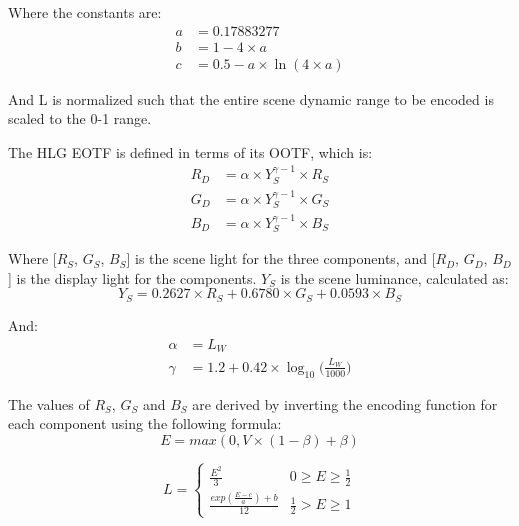 Where the constants are:
\begin{align}
    a &= 0.17883277 \nonumber \\
    b &= 1 - 4 \times a \nonumber \\
    c &= 0.5 - a \times \ln (4 \times a) \nonumber
\end{align}

And L is normalized such that the entire scene dynamic range to be encoded is scaled to the 0-1 range.

\begin{figure}[H]
    \label{fig:hlg-oetf}
\end{figure}

The HLG EOTF is defined in terms of its OOTF, which is:
\begin{align}
    R_D &= \alpha \times Y_S^{\gamma -1}  \times R_S \nonumber \\
    G_D &= \alpha \times Y_S^{\gamma -1}  \times G_S \\
    B_D &= \alpha \times Y_S^{\gamma -1}  \times B_S \nonumber
\end{align}

Where [\(R_S\), \(G_S\), \(B_S\)] is the scene light for the three components, and  [\(R_D\), \(G_D\), \(B_D\)] is the display light for the components.
\(Y_S\) is the scene luminance, calculated as:
\begin{equation}
    Y_S = 0.2627 \times R_S + 0.6780 \times G_S + 0.0593 \times B_S
\end{equation}

And:
\begin{align}
    \alpha &= L_W \\
    \gamma &= 1.2 + 0.42 \times \log _{10} \big(\frac{L_W}{1000} \big)
\end{align}

The values of \(R_S\), \(G_S\) and \(B_S\) are derived by inverting the encoding function for each component using the following formula:
\begin{equation}
    E = max(0, V \times (1 - \beta) + \beta)
\end{equation}

\begin{equation}
  L =
  \begin{cases}
    \frac{E^2}{3} & 0\geq E \geq {\frac{1}{2}} \\
    \frac{{exp{(\frac{E - c}{a})}} + b}{12} & {\frac{1}{2}} > E \geq 1
  \end{cases}
\end{equation}

